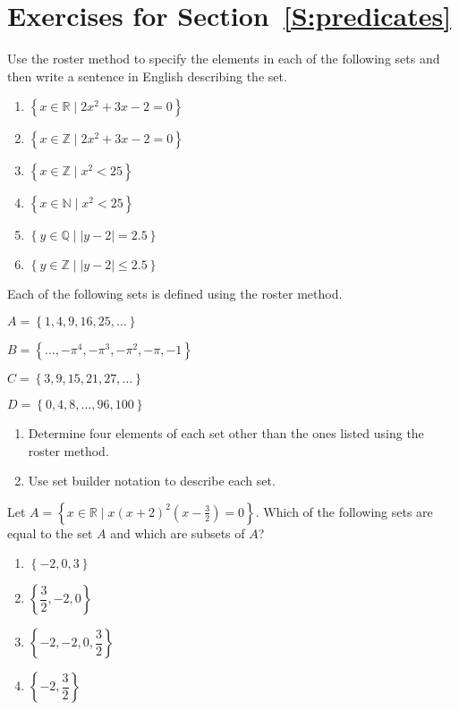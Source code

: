 \section*{Exercises for Section~\ref{S:predicates}}
%
\begin{enumerate}
\xitem Use the roster method to specify the elements in each of the following sets and then write a sentence in English describing the set. 
\label{exer:sec21-1}
%
\begin{multicols}{2}
\begin{enumerate}
  \item $\left\{ x \in \mathbb{R} \mid 2x^2 + 3x - 2 = 0 \right\}$
  \item $\left\{ {x \in \mathbb{Z}} \mid 2x^2  + 3x - 2 = 0 \right\}$
  \item $\left\{ {x \in \mathbb{Z}} \mid x^2  < 25 \right\}$
  \item $\left\{ {x \in \mathbb{N}} \mid x^2  < 25 \right\}$
  \item $\left\{ {y \in \mathbb{Q}} \mid \left| {y - 2} \right| = 2.5 \right\}$
  \item $\left\{ {y \in \mathbb{Z}} \mid \left| {y - 2} \right| \leq 2.5 \right\}$
\end{enumerate}
\end{multicols}

\xitem Each of the following sets is defined using the roster method. \label{exer:setbuilder}

\begin{multicols}{2}
$A = \left\{1, 4, 9, 16, 25, \ldots \right\}$

$B = \left\{\ldots, -\pi^4, -\pi^3, -\pi^2, -\pi, -1 \right\}$

$C = \left\{3, 9, 15, 21, 27, \ldots \right\}$

$D = \left\{0, 4, 8, \ldots, 96, 100 \right\}$
\end{multicols}

\begin{enumerate}
\item Determine four elements of each set other than the ones listed using the roster method.

\item Use set builder notation to describe each set.
\end{enumerate}

\xitem Let 
\label{exer:sec21-2}%
$A = \left\{ x \in \mathbb{R}  \mid  x\left( {x + 2} \right)^2 \left( x - \frac{3}{2} \right) = 0 \right\}$.  Which of the following sets are equal to the set $A$ and which are subsets of $A$?
%
\begin{multicols}{2}
\begin{enumerate}
  \item $\left\{ { - 2, 0,3} \right\}$
  \item $\left\{ {\dfrac{3}{2}, - 2,0} \right\}$
  \item $\left\{ { - 2, - 2,0,\dfrac{3}{2}} \right\}$
  \item $\left\{ { - 2, \dfrac{3}{2}} \right\}$
\end{enumerate}
\end{multicols}



\end{enumerate}

